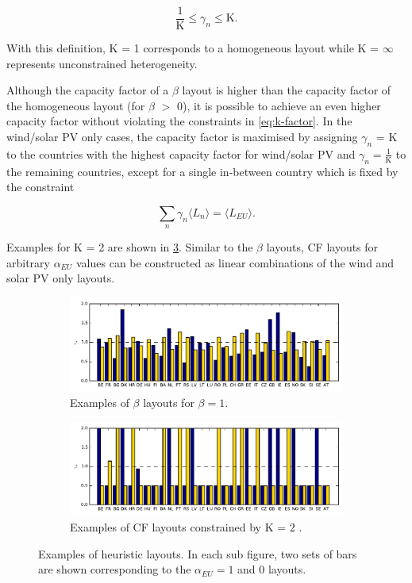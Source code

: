 \documentclass[a4paper, 5p, sort&compress]{elsarticle}%
\newcommand{\mean}[1]{\langle #1 \rangle}
\newcommand{\chromowidth}{1.00 \columnwidth}
\begin{document}
\begin{equation}
  \label{eq:k-factor}
  \frac{1}{\text{K}} \leq \gamma_{n} \leq \text{K} .
\end{equation}

With this definition, K = 1 corresponds to a homogeneous layout while
K = $\infty$ represents unconstrained heterogeneity.

Although the capacity factor of a $\beta$ layout is higher than the
capacity factor of the homogeneous layout (for $\beta$ $>$ 0), it is
possible to achieve an even higher capacity factor without violating
the constraints in \cref{eq:k-factor}. In the wind/solar PV only
cases, the capacity factor is maximised by assigning $\gamma_{n}$ = K to
the countries with the highest capacity factor for wind/solar PV and
$\gamma_{n} = \frac{1}{\text{K}}$ to the remaining countries, except for a
single in-between country which is fixed by the constraint 

\begin{equation}
  \label{eq:5}
  \sum_{n} \gamma_{n} \mean{L_{n}} = \mean{L_{EU}}.
\end{equation}

Examples for K = 2 are shown in
\cref{fig:examples}. Similar to the $\beta$ layouts, CF layouts for
arbitrary $\alpha_{EU}$ values can be constructed as linear combinations of the
wind and solar PV only layouts.

\begin{figure}[t!]
  \centering
  \begin{subfigure}{2\columnwidth}
    \includegraphics[width = \chromowidth, center]{beta=1}
    \caption{Examples of $\beta$ layouts for $\beta = 1$.}
    \label{fig:betaExamples}    
  \end{subfigure}
  \begin{subfigure}{2\columnwidth}
    \includegraphics[width = \chromowidth, center]{k=2cfMax}
    \caption{Examples of CF layouts constrained by K = 2 .}
    \label{fig:cfMaxExamples}    
  \end{subfigure}
  \caption{Examples of heuristic layouts. In each sub figure, two sets
    of bars are shown corresponding to the $\alpha_{EU} = 1$ and $0$
    layouts.}
  \label{fig:examples}
\end{figure}
\end{document}
